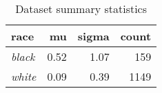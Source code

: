 \begin{table}[H]

\caption{\label{tab:dataset_summary}Dataset summary statistics}
\centering
\begin{tabular}[t]{>{}l|r|r|r}
\hline
race & mu & sigma & count\\
\hline
\hline
\em{black} & 0.52 & 1.07 & 159\\
\hline
\em{white} & 0.09 & 0.39 & 1149\\
\hline
\end{tabular}
\end{table}